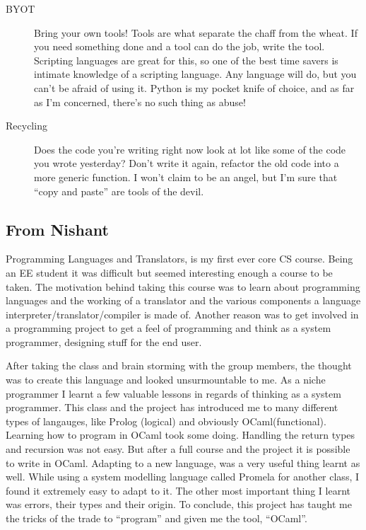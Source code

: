 \documentclass[onecolumn,titlepage]{article}
\begin{document}
\begin{description}
  \item[BYOT] Bring your own tools!  Tools are what separate the chaff
    from the wheat.  If you need something done and a tool can do the
    job, write the tool.  Scripting languages are great for this, so
    one of the best time savers is intimate knowledge of a scripting
    language.  Any language will do, but you can't be afraid of using
    it.  Python is my pocket knife of choice, and as far as I'm
    concerned, there's no such thing as abuse!

  \item[Recycling] Does the code you're writing right now look at lot
    like some of the code you wrote yesterday?  Don't write it again,
    refactor the old code into a more generic function.  I won't claim
    to be an angel, but I'm sure that ``copy and paste'' are tools of
    the devil.
\end{description}

\subsection{From Nishant}

Programming Languages and Translators, is my first ever core CS
course. Being an EE student it was difficult but seemed interesting
enough a course to be taken. The motivation behind taking this course
was to learn about programming languages and the working of a
translator and the various components a language
interpreter/translator/compiler is made of. Another reason was to get
involved in a programming project to get a feel of programming and
think as a system programmer, designing stuff for the end user.

After taking the class and brain storming with the group members, the
thought was to create this language and looked unsurmountable to
me. As a niche programmer I learnt a few valuable lessons in regards
of thinking as a system programmer. This class and the project has
introduced me to many different types of langauges, like Prolog
(logical) and obviously OCaml(functional). Learning how to program in
OCaml took some doing. Handling the return types and recursion was not
easy. But after a full course and the project it is possible to write
in OCaml.  Adapting to a new language, was a very useful thing learnt
as well. While using a system modelling language called Promela for
another class, I found it extremely easy to adapt to it. The other
most important thing I learnt was errors, their types and their
origin. To conclude, this project has taught me the tricks of the
trade to ``program'' and given me the tool, ``OCaml''.
\end{document}
